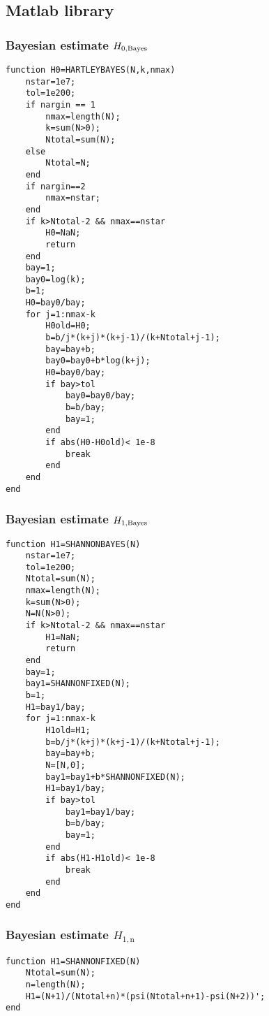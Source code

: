 \subsection{Matlab library}

\subsubsection{Bayesian estimate $ H_{0,\mbox{\scriptsize{Bayes}}}$ }
\ttfamily
\begin{lstlisting}
function H0=HARTLEYBAYES(N,k,nmax)
    nstar=1e7;
    tol=1e200; 
    if nargin == 1
        nmax=length(N);
        k=sum(N>0);
        Ntotal=sum(N);
    else
        Ntotal=N;
    end
    if nargin==2
        nmax=nstar;
    end
    if k>Ntotal-2 && nmax==nstar
        H0=NaN;
        return
    end
    bay=1;
    bay0=log(k);
    b=1;
    H0=bay0/bay;
    for j=1:nmax-k
        H0old=H0;
        b=b/j*(k+j)*(k+j-1)/(k+Ntotal+j-1);
        bay=bay+b;
        bay0=bay0+b*log(k+j);
        H0=bay0/bay;
        if bay>tol
            bay0=bay0/bay;
            b=b/bay;
            bay=1;
        end
        if abs(H0-H0old)< 1e-8
            break
        end
    end
end
\end{lstlisting}

\normalfont
\subsubsection{Bayesian estimate $ H_{1,\mbox{\scriptsize{Bayes}}}$ }
\ttfamily
\begin{lstlisting}
function H1=SHANNONBAYES(N)
    nstar=1e7;
    tol=1e200; 
    Ntotal=sum(N);
    nmax=length(N);
    k=sum(N>0);
    N=N(N>0);
    if k>Ntotal-2 && nmax==nstar
        H1=NaN;
        return
    end
    bay=1;
    bay1=SHANNONFIXED(N);
    b=1;
    H1=bay1/bay;
    for j=1:nmax-k
        H1old=H1;
        b=b/j*(k+j)*(k+j-1)/(k+Ntotal+j-1);
        bay=bay+b;
        N=[N,0];
        bay1=bay1+b*SHANNONFIXED(N);
        H1=bay1/bay;
        if bay>tol
            bay1=bay1/bay;
            b=b/bay;
            bay=1;
        end
        if abs(H1-H1old)< 1e-8
            break
        end
    end
end
\end{lstlisting}

\normalfont
\subsubsection{Bayesian estimate $ H_{1,\text{n}}$ }
\ttfamily
\begin{lstlisting}
function H1=SHANNONFIXED(N)
	Ntotal=sum(N);
	n=length(N);
	H1=(N+1)/(Ntotal+n)*(psi(Ntotal+n+1)-psi(N+2))';
end
\end{lstlisting}

\normalfont
\ttfamily
\begin{lstlisting}

\end{lstlisting}


